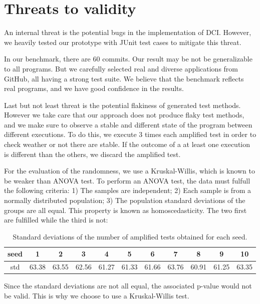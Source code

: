 \section{Threats to validity}
\label{sec:threats}

An internal threat is the potential bugs in the implementation of DCI. However, we heavily tested our prototype with JUnit test cases to mitigate this threat.

In our benchmark, there are 60 commits. Our result may be not be generalizable to all programs. But we carefully selected real and diverse applications from GitHub, all having a strong test suite. We believe that the benchmark reflects real programs, and we have good confidence in the results.

Last but not least threat is the potential flakiness of generated test methods.
However we take care that our approach does not produce flaky test methods, and we make sure to observe a stable and different state of the program between different executions. 
To do this, we execute 3 times each amplified test in order to check weather or not there are stable.
If the outcome of a at least one execution is different than the others, we discard the amplified test.

For the evaluation of the randomness, we use a Kruskal-Willis, which is known to be weaker than ANOVA test.
To perform an ANOVA test, the data must fulfull the following criteria:
1) The samples are independent;
2) Each sample is from a normally distributed population;
3) The population standard deviations of the groups are all equal. This property is known as homoscedasticity.
The two first are fulfilled while the third is not:
\begin{table}
\def\arraystretch{1}%
\setlength\tabcolsep{3pt} %
\caption{Standard deviations of the number of amplified tests obtained for each seed.}
\begin{tabular}{c|cccccccccc}
seed     & 1 & 2 & 3 & 4 & 5 & 6 & 7 & 8 & 9 & 10 \\
\hline
std     & 63.38&63.55&62.56&61.27&61.33&61.66&63.76&60.91&61.25&63.35
\end{tabular}
\end{table}
Since the standard deviations are not all equal, the associated p-value would not be valid.
This is why we choose to use a Kruskal-Willis test.

